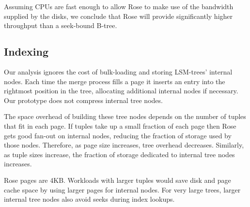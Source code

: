 \documentclass{vldb}
\newcommand{\rows}{Rose\xspace}
\newcommand{\rowss}{Rose's\xspace}
\begin{document}
Assuming CPUs are fast enough to allow \rows to make use of the bandwidth supplied
by the disks, we conclude that \rows will provide significantly higher
throughput than a seek-bound B-tree.

\subsection{Indexing}

Our analysis ignores the cost of bulk-loading and storing
LSM-trees' internal nodes.  Each time the merge process fills a page it
inserts an entry into the rightmost position in the tree, allocating
additional internal nodes if necessary.  Our prototype does not
compress internal tree nodes.

The space overhead of building these tree nodes depends on the number
of tuples that fit in each page.  If tuples take up a small fraction
of each page then \rows gets good fan-out on internal nodes, reducing
the fraction of storage used by those nodes.  Therefore, as page
size increases, tree overhead decreases.  Similarly, as tuple sizes
increase, the fraction of storage dedicated to internal tree nodes
increases.

\rows pages are 4KB.  Workloads with
larger tuples would save disk and page cache space by using larger
pages for internal nodes.  For very large trees, larger internal tree
nodes also avoid seeks during index lookups.


\end{document}
